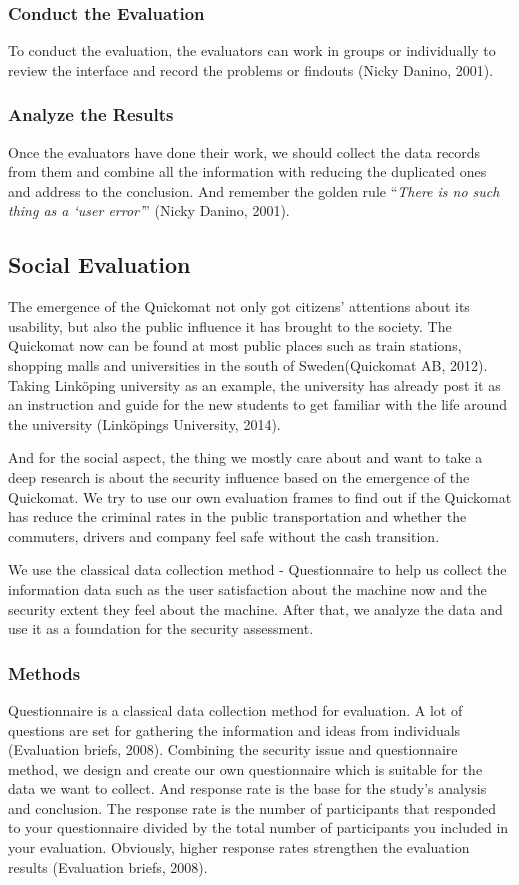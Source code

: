 \documentclass[twocolumn]{article}
\begin{document}
\subsubsection{Conduct the Evaluation}
To conduct the evaluation, the evaluators can work in groups or individually to review the interface and record the problems or findouts (Nicky Danino, 2001).

\subsubsection{Analyze the Results}
Once the evaluators have done their work, we should collect the data records from them and combine all the information with reducing the duplicated ones and address to the conclusion. And remember the golden rule “\emph{There is no such thing as a ‘user error’}” (Nicky Danino, 2001).

\subsection{Social Evaluation}
The emergence of the Quickomat not only got citizens’ attentions about its usability, but also the public influence it has brought to the society. The Quickomat now can be found at most public places such as train stations, shopping malls and universities in the south of Sweden(Quickomat AB, 2012). Taking Linköping university as an example, the university has already post it as an instruction and guide for the new students to get familiar with the life around the university (Linköpings University, 2014). 

And for the social aspect, the thing we mostly care about and want to take a deep research is about the security influence based on the emergence of the Quickomat. We try to use our own evaluation frames to find out if the Quickomat has reduce the criminal rates in the public transportation and whether the commuters, drivers and company feel safe without the cash transition. 

We use the classical data collection method - Questionnaire to help us collect the information data such as the user satisfaction about the machine now and the security extent they feel about the machine.
After that, we analyze the data and use it as a foundation for the security assessment.

\subsubsection{Methods}
Questionnaire is a classical data collection method for evaluation. A lot of questions are set for gathering the information and ideas from individuals (Evaluation briefs, 2008). Combining the security issue and questionnaire method, we design and create our own questionnaire which is suitable for the data we want to collect. And response rate is the base for the study’s analysis and conclusion. The response rate is the number of participants that responded to your questionnaire divided by the total number of participants you included in your evaluation. Obviously, higher response rates strengthen the evaluation results (Evaluation briefs, 2008). 
\end{document}
